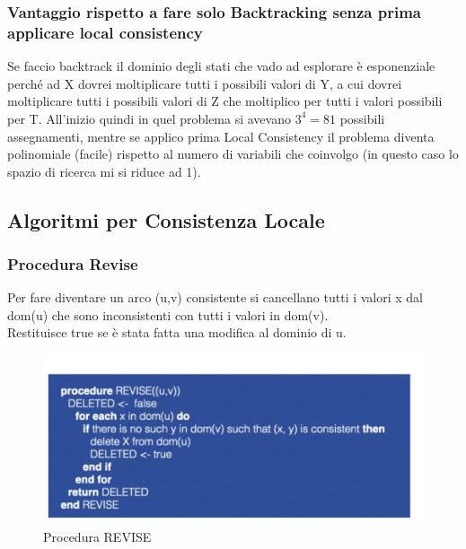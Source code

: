 \subsubsection{\textbf{Vantaggio rispetto a fare solo Backtracking senza prima applicare local consistency}}
Se faccio backtrack il dominio degli stati che vado ad esplorare è esponenziale perché ad X dovrei moltiplicare tutti i possibili valori di Y, a cui dovrei moltiplicare tutti i possibili valori di Z che moltiplico per tutti i valori possibili per T. All'inizio quindi in quel problema si avevano $3^4 = 81$ possibili assegnamenti, mentre se applico prima Local Consistency il problema diventa polinomiale (facile) rispetto al numero di variabili che coinvolgo (in questo caso lo spazio di ricerca mi si riduce ad 1).

\subsection{Algoritmi per Consistenza Locale}
\subsubsection{Procedura Revise}
Per fare diventare un arco (u,v) consistente si cancellano tutti i valori x dal dom(u) che sono inconsistenti con tutti i valori in dom(v).
\\Restituisce true se è stata fatta una modifica al dominio di u.
\begin{figure}[H]
    \centering
    \includegraphics[width=13cm, keepaspectratio]{img/Cap3/revise.png}
    \caption{Procedura REVISE}
\end{figure}

